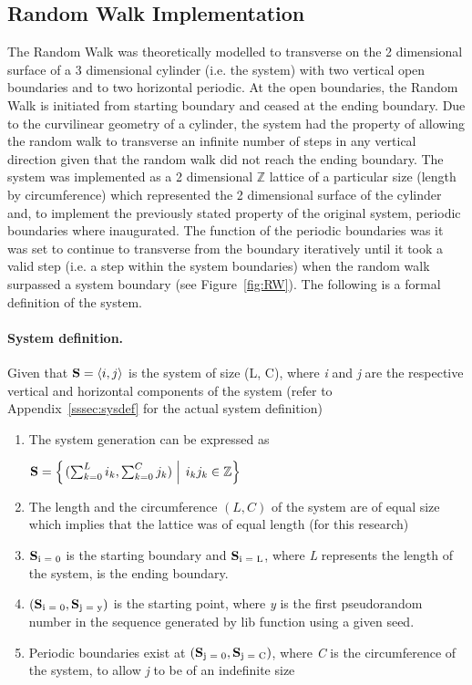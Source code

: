 \documentclass{article}
\DeclarePairedDelimiter{\opair}{\langle}{\rangle}
\begin{document}
\subsection{Random Walk Implementation}
	The Random Walk was theoretically modelled to transverse on the 2 dimensional surface of a 3 dimensional cylinder (i.e. the system) with two vertical open boundaries and to two horizontal periodic. At the open boundaries, the  Random Walk is initiated from starting boundary and ceased at the ending boundary. Due to the curvilinear geometry of a cylinder, the system had the property of allowing the random walk to transverse an infinite number of steps in any vertical direction given that the random walk did not reach the ending boundary. 
The system was implemented as a 2 dimensional $\mathbb{Z}$ lattice of a particular size (length by circumference) which represented the 2 dimensional surface of the cylinder and, to implement the previously stated property of the original system, periodic boundaries where inaugurated. The function of the periodic boundaries was it was set to continue to transverse from the boundary iteratively until it took a valid step (i.e. a step within the system boundaries) when the random walk surpassed a system boundary (see Figure~\ref{fig:RW}). The following is a formal definition of the system.

\paragraph{System definition.}\label{subsec:sysfdef} Given that $\vb{S}=\opair{i, j}$ is the system of size (L, C), where \emph{i} and \emph{j} are the respective vertical and horizontal components of the system (refer to Appendix~\ref{sssec:sysdef} for the actual system definition)
	\begin{enumerate}
		\item The system generation can be expressed as
			\begin{center}
				$\vb{S} = \left\{\left. (\sum_{k=0}^L i_k,  \sum_{k=0}^C j_k) \; \right\vert \;i_k j_k \in\mathbb{Z} \right\}$
			\end{center}
		\item The length and the circumference $(L, C)$ of the system are of equal size which implies that the lattice was of equal length (for this research)
		\item $\vb{S}\textsubscript{i = 0}$ is the starting boundary and $\vb{S}\textsubscript{i = L}$, where \emph{L}  represents the length of the system, is the ending boundary. 
		\item $(\vb{S}\textsubscript{i = 0}, \vb{S}\textsubscript{j = y})$  is the starting point, where \emph{y} is the first pseudorandom number in the sequence generated by lib function using a given seed.
		\item Periodic boundaries exist at $(\vb{S}\textsubscript{j = 0}, \vb{S}\textsubscript{j = C})$, where \emph{C} is the circumference of the system, to allow \emph{j} to be of an indefinite size
	\end{enumerate}
\end{document}
